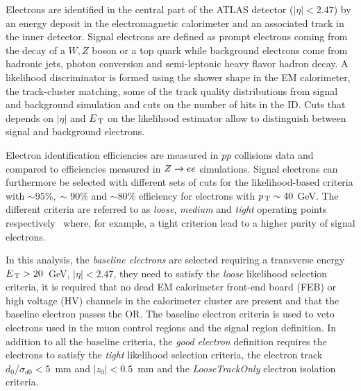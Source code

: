 Electrons are identified in the central part of the ATLAS detector
($|\eta| < 2.47$) by an energy deposit in the electromagnetic calorimeter and an
associated track in the inner detector. Signal electrons are defined as prompt
electrons coming from the decay of a $W, Z$ boson or a top quark while
background electrons come from hadronic jets, photon conversion and
semi-leptonic heavy flavor hadron decay. A likelihood discriminator is formed
using the shower shape in the EM calorimeter, the track-cluster matching, some
of the track quality distributions from signal and background simulation and
cuts on the number of hits in the ID. Cuts that depends on $|\eta|$ and $E_\mathrm{\, T}$ on
the likelihood estimator allow to distinguish between signal and background
electrons.

Electron identification efficiencies are measured in $pp$ collisions data and
compared to efficiencies measured in $Z \to e e$ simulations. Signal electrons can
furthermore be selected with different sets of cuts for the likelihood-based
criteria with $\sim 95\%, \sim 90\%$ and $\sim 80\%$ efficiency for electrons
with $p_\mathrm{\, T} \sim 40~$GeV. The different criteria are referred to as \emph{loose},
\emph{medium} and \emph{tight} operating points respectively~\cite{ATL-EL-IDENT}
where, for example, a tight criterion lead to a higher purity of signal
electrons.

In this analysis, the \emph{baseline electrons} are selected requiring a
transverse energy $E_\mathrm{\, T} > 20$~GeV, $|\eta| < 2.47$, they need to satisfy the
\emph{loose} likelihood selection criteria, it is required that no dead EM
calorimeter front-end board (FEB) or high voltage (HV) channels in the
calorimeter cluster are present and that the baseline electron passes the
OR. The baseline electron criteria is used to veto electrons used in the muon
control regions and the signal region definition. In addition to all the
baseline criteria, the \emph{good electron} definition requires the electrons to
satisfy the \emph{tight} likelihood selection criteria, the electron track
$d_0 / \sigma_{d0} < 5$~mm and $|z_0| < 0.5$~mm and the \emph{LooseTrackOnly}
electron isolation criteria.

